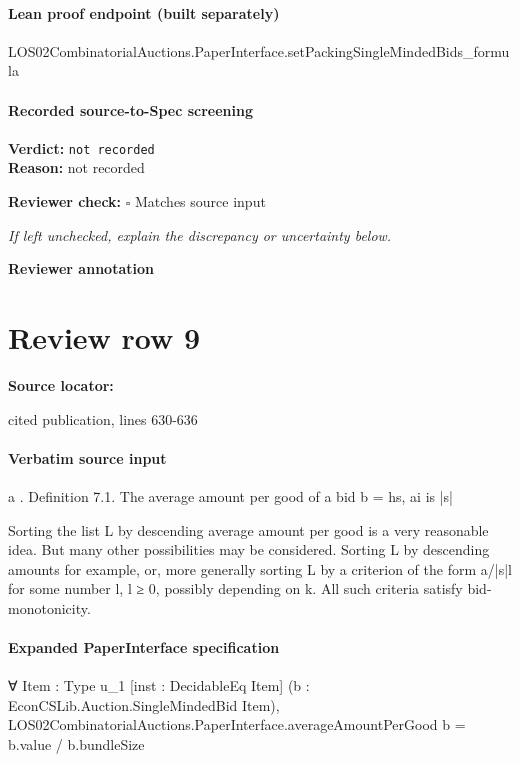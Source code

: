 \documentclass[10pt]{article}
\newcommand{\reviewerbox}{%
  \par\noindent\fbox{\parbox{0.96\linewidth}{\rule{0pt}{0.38in}}}\par
}
\newcommand{\reviewmatch}[1]{%
  \par\noindent\textbf{Reviewer check:} $\square$\; #1\par
  \noindent\emph{If left unchecked, explain the discrepancy or uncertainty below.}\par
}
\begin{document}
\paragraph{Lean proof endpoint (built separately)}\begin{ReviewVerbatim}
LOS02CombinatorialAuctions.PaperInterface.setPackingSingleMindedBids_formula
\end{ReviewVerbatim}

\paragraph{Recorded source-to-Spec screening}
\textbf{Verdict:} \texttt{not recorded}
\\
\textbf{Reason:} not recorded
\reviewmatch{Matches source input}
\noindent\textbf{Reviewer annotation}\par
\reviewerbox
\clearpage
\hypertarget{source-claim-7b218a9a6f89df2a}{}
\section*{Review row 9}
\textbf{Source locator:} {\footnotesize\raggedright cited publication, lines 630-\allowbreak{}636\par}
\paragraph{Verbatim source input}
\begin{ReviewVerbatim}
a
.
Definition 7.1. The average amount per good of a bid b = hs, ai is |s|

Sorting the list L by descending average amount per good is a very reasonable idea. But many other possibilities may be considered. Sorting L by descending amounts for example, or, more generally sorting L by a criterion of the form
a/|s|l for some number l, l ≥ 0, possibly depending on k. All such criteria satisfy
bid-monotonicity.
\end{ReviewVerbatim}


\paragraph{Expanded PaperInterface specification}
\begin{ReviewVerbatim}
∀ {Item : Type u_1} [inst : DecidableEq Item] (b : EconCSLib.Auction.SingleMindedBid Item),
  LOS02CombinatorialAuctions.PaperInterface.averageAmountPerGood b = b.value / b.bundleSize
\end{ReviewVerbatim}
\end{document}
